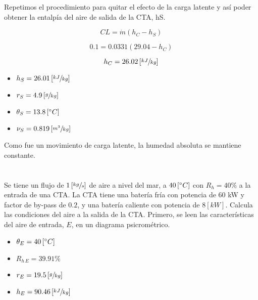 \documentclass[11pt]{article}
\begin{document}
Repetimos el procedimiento para quitar el efecto de la carga latente y así poder obtener la entalpía del aire de salida de la CTA, hS.

\[ CL = \dot{ m } \left( h_C - h_S \right) \]

\[ 0.1 = 0.0331 \left( 29.04 - h_C \right) \]

\[ h_C = 26.02 \left[ \sfrac{ kJ }{ kg } \right]\]

\begin{itemize}
    \item
    $ h_S = 26.01 \left[ \sfrac{ kJ }{ kg } \right] $
    
    \item
    $ r_S = 4.9 \left[ \sfrac{ g }{ kg } \right] $
    
    \item
    $ \theta _S = 13.8 \left[ \degree C \right] $
    
    \item
    $ \nu _S = 0.819 \left[ \sfrac{ m^3 }{ kg } \right] $

\end{itemize}

Como fue un movimiento de carga latente, la humedad absoluta se mantiene constante.

\section{}

Se tiene un flujo de $ 1 \left[ \sfrac{ kg }{ s } \right] $ de aire a nivel del mar, a $ 40 \left[ \degree C \right]  $ con $ R_h = 40\% $ a la entrada de una CTA. La CTA tiene una batería fría con potencia de 60 kW y factor de by-pass de $ 0.2 $, y una batería caliente con potencia de $ 8 \left[ kW \right] $. Calcula las condiciones del aire a la salida de la CTA.
Primero, se leen las características del aire de entrada, $ E $, en un diagrama psicrométrico.

\begin{itemize}
    \item
    $ \theta _E = 40 \left[ \degree C \right] $

    \item
    $ R_{ h \, E } = 39.91\% $

    \item
    $ r_E = 19.5 \left[ \sfrac{ g }{ kg } \right] $

    \item
    $ h_E = 90.46 \left[ \sfrac{ kJ }{ kg } \right] $

\end{itemize}
\end{document}
